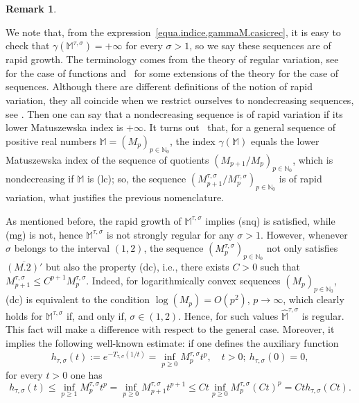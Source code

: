 \documentclass[12pt,leqno]{amsart}
\def\N{\mathbb{N}}
\theoremstyle{plain}
\theoremstyle{definition}
\newtheorem{rem}[theo]{Remark}
\numberwithin{equation}{section}
\def\M{\mathbb{M}}
\begin{document}
\begin{rem}\label{rem.RapidGrowth}


We note that, from the expression~\eqref{equa.indice.gammaM.casicrec}, it is easy to check that $\gamma(\M^{\tau,\sigma})=+\infty$ for every $\sigma>1$, so we say these sequences are of rapid growth. The terminology comes from the theory of regular variation, see~\cite{bgt} for the case of functions and~\cite{DjurcicKocinacZizovic07,JimenezSanzSchindlIndex} for some extensions of the theory for the case of sequences. Although there are different definitions of the notion of rapid variation, they all coincide when we restrict ourselves to nondecreasing sequences, see \cite{DjurcicElezKocinac15}.  Then one can say that a nondecreasing  sequence is of rapid variation if its lower Matuszewska index is $+\infty$. It turns out~\cite[Section~3.3]{JimenezSanzSchindlIndex} that, for a general sequence of positive real numbers $\M=(M_p)_{p\in\N_0}$, the index $\gamma(\M)$ equals the lower Matuszewska index of the sequence of quotients $(M_{p+1}/M_p)_{p\in\N_0}$, which is nondecreasing if $\M$ is (lc); so, the sequence $(M^{\tau,\sigma}_{p+1}/M^{\tau,\sigma}_p)_{p\in\N_0}$ is of rapid variation, what justifies the previous nomenclature.


As mentioned before, the rapid growth of $\M^{\tau,\sigma}$ implies (snq) is satisfied, while (mg) is not, hence $\M^{\tau,\sigma}$ is not strongly regular for any $\sigma>1$. However, whenever $\sigma$ belongs to the interval $(1,2)$, the sequence $(M_p^{\tau,\sigma})_{p\in\N_0}$ not only satisfies $\overline{(M.2)'}$  but also  the property (dc), i.e., there exists $C>0$ such that $M_{p+1}^{\tau,\sigma}\le C^{p+1}M_{p}^{\tau,\sigma}$. Indeed, for logarithmically convex sequences $(M_p)_{p\in\N_0}$, (dc) is equivalent to the condition $\log(M_p)=O(p^2)$, $p\to\infty$, which clearly holds for $\M^{\tau,\sigma}$ if, and only if, $\sigma\in(1,2)$. Hence, for such values $\widehat{\M}^{\tau,\sigma}$ is regular. This fact will make a difference with respect to the general case. Moreover, it implies the following well-known estimate: if one defines the auxiliary function
$$
h_{\tau,\sigma}(t):=e^{-T_{\tau,\sigma}(1/t)}=\inf_{p\ge 0}M_{p}^{\tau,\sigma}t^p,\quad t>0;\ h_{\tau,\sigma}(0)=0,
$$
for every $t>0$ one has
\begin{equation}
h_{\tau,\sigma}(t)\le
\inf_{p\ge 1}M_{p}^{\tau,\sigma}t^p=\inf_{p\ge 0}M_{p+1}^{\tau,\sigma}t^{p+1}\le Ct\inf_{p\ge 0}M_{p}^{\tau,\sigma}(Ct)^p=Ct h_{\tau,\sigma}(Ct).\label{eq.Estimate_h_tausigma_dc}
\end{equation}
\end{rem}
\end{document}
